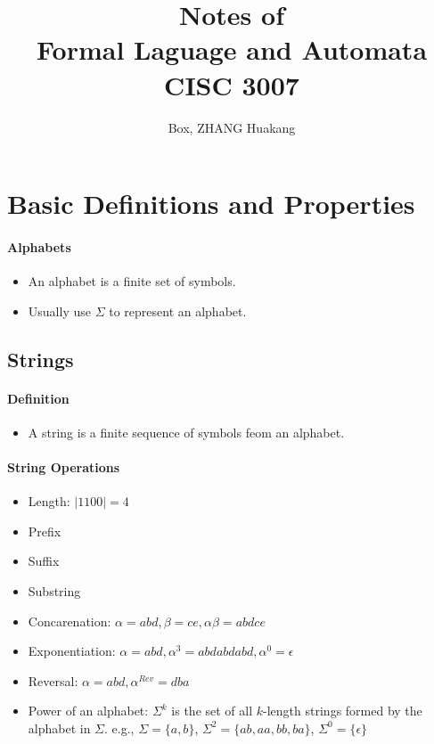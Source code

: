 \documentclass[titlepage]{article}
\title{Notes of\\ Formal Laguage and Automata\\ CISC 3007}
\author{Box, ZHANG Huakang}
\begin{document}
    \maketitle
    \section{Basic Definitions and Properties}
        \paragraph{Alphabets}
        \begin{itemize}
            \item An alphabet is a finite set of symbols. 
            \item Usually use $\Sigma$ to represent an alphabet.
        \end{itemize}
        \subsection*{Strings}
            \paragraph{Definition}
            \begin{itemize}
                \item A string is a finite sequence of symbols feom an alphabet.
            \end{itemize}
            \paragraph{String Operations}
            \begin{itemize}
                \item Length: $|1100|=4$
                \item Prefix
                \item Suffix
                \item Substring
                \item Concarenation: $\alpha=abd,\beta=ce,\alpha\beta=abdce$
                \item Exponentiation: $\alpha=abd, \alpha^3=abdabdabd, \alpha^0=\epsilon$
                \item Reversal: $\alpha=abd, \alpha^{Rev}=dba$
                \item Power of an alphabet: $\Sigma^k$ is the set of all $k$-length strings formed by the alphabet in $\Sigma$. e.g., $\Sigma=\{a,b\}$, $\Sigma^2=\{ab,aa,bb,ba\}$, $\Sigma^0=\{\epsilon\}$
            \end{itemize}
\end{document}
